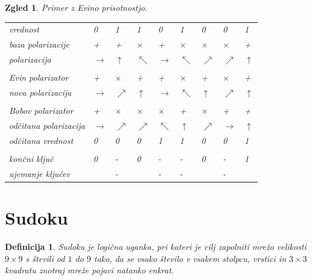 \documentclass[A4paper, 11pt]{article}
\newtheorem{definicija}{Definicija}
\newtheorem{zgled}{Zgled}
\newcommand{\cmark}{\ding{51}}
\newcommand{\xmark}{\ding{55}}
\begin{document}
\begin{zgled} \label{zgled-eva}
Primer z Evino prisotnostjo.

\begin{center}
\begin{tabular}{ l m{0.3 cm} m{0.3 cm} m{0.3 cm} m{0.3 cm} m{0.3 cm} m{0.3 cm} m{0.3 cm} m{0.3 cm}}
vrednost & 0 & 1 & 1 & 0 & 1 & 0 & 0 & 1\\
baza polarizacije & + & + & $\times$ & + & $\times$ & $\times$ & $\times$ & + \\
polarizacija & $\rightarrow$ & $\uparrow$ & $\nwarrow$ & $\rightarrow$ & $\nwarrow$ & $\nearrow$ & $\nearrow$  & $\uparrow$\\
\\
Evin polarizator & + & $\times$ & + & + & $\times$ & + & $\times$ & +\\
nova polarizacija & $\rightarrow$ & $\nearrow$ & $\uparrow$ & $\rightarrow$ & $\nwarrow$  & $\uparrow$ & $\nearrow$ & $\uparrow$\\
\\
Bobov polarizator & + & $\times$ & $\times$ & $\times$ & + & $\times$ & + & +\\
odčitana polarizacija & $\rightarrow$ & $\nearrow$ & $\nearrow$ & $\nwarrow$ & $\uparrow$  & $\nearrow$ & $\rightarrow$ & $\uparrow$\\
odčitana vrednost & 0 & 0 & 0 & 1 & 1 & 0 & 0 & 1\\
\\
končni ključ & 0 & - & 0 & - & - & 0 & - & 1\\
ujemanje ključev & \cmark & - & \xmark & - & - & \cmark & - & \cmark\\ 
\end{tabular}
\end{center}

\end{zgled}



\section{Sudoku}

\begin{definicija}
Sudoku je logična uganka, pri kateri je cilj zapolniti mrežo velikosti $9\times9$ s števili od $1$ do $9$ tako, da se vsako število v vsakem stolpcu, vrstici in $3\times3$ kvadratu znotraj mreže pojavi natanko enkrat.
\end{definicija}
\end{document}
